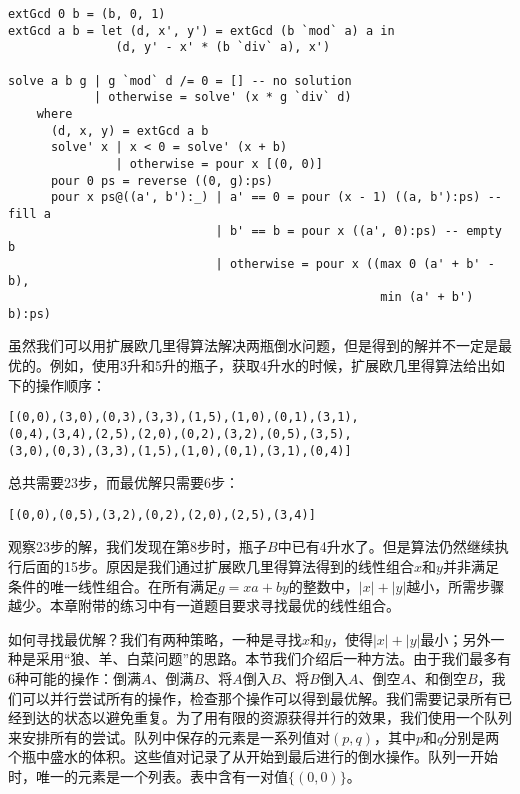 \documentclass[UTF8]{article}
\begin{document}
\lstset{language=Haskell}
\begin{lstlisting}
extGcd 0 b = (b, 0, 1)
extGcd a b = let (d, x', y') = extGcd (b `mod` a) a in
               (d, y' - x' * (b `div` a), x')

solve a b g | g `mod` d /= 0 = [] -- no solution
            | otherwise = solve' (x * g `div` d)
    where
      (d, x, y) = extGcd a b
      solve' x | x < 0 = solve' (x + b)
               | otherwise = pour x [(0, 0)]
      pour 0 ps = reverse ((0, g):ps)
      pour x ps@((a', b'):_) | a' == 0 = pour (x - 1) ((a, b'):ps) -- fill a
                             | b' == b = pour x ((a', 0):ps) -- empty b
                             | otherwise = pour x ((max 0 (a' + b' - b),
                                                    min (a' + b') b):ps)
\end{lstlisting}

虽然我们可以用扩展欧几里得算法解决两瓶倒水问题，但是得到的解并不一定是最优的。例如，使用3升和5升的瓶子，获取4升水的时候，扩展欧几里得算法给出如下的操作顺序：

\begin{verbatim}
[(0,0),(3,0),(0,3),(3,3),(1,5),(1,0),(0,1),(3,1),
(0,4),(3,4),(2,5),(2,0),(0,2),(3,2),(0,5),(3,5),
(3,0),(0,3),(3,3),(1,5),(1,0),(0,1),(3,1),(0,4)]
\end{verbatim}

总共需要23步，而最优解只需要6步：

\begin{verbatim}
[(0,0),(0,5),(3,2),(0,2),(2,0),(2,5),(3,4)]
\end{verbatim}

观察23步的解，我们发现在第8步时，瓶子$B$中已有4升水了。但是算法仍然继续执行后面的15步。原因是我们通过扩展欧几里得算法得到的线性组合$x$和$y$并非满足条件的唯一线性组合。在所有满足$g = x a + b y$的整数中，$|x| + |y|$越小，所需步骤越少。本章附带的练习中有一道题目要求寻找最优的线性组合。

如何寻找最优解？我们有两种策略，一种是寻找$x$和$y$，使得$|x| + |y|$最小；另外一种是采用“狼、羊、白菜问题”的思路。本节我们介绍后一种方法。由于我们最多有6种可能的操作：倒满$A$、倒满$B$、将$A$倒入$B$、将$B$倒入$A$、倒空$A$、和倒空$B$，我们可以并行尝试所有的操作，检查那个操作可以得到最优解。我们需要记录所有已经到达的状态以避免重复。为了用有限的资源获得并行的效果，我们使用一个队列来安排所有的尝试。队列中保存的元素是一系列值对$(p, q)$，其中$p$和$q$分别是两个瓶中盛水的体积。这些值对记录了从开始到最后进行的倒水操作。队列一开始时，唯一的元素是一个列表。表中含有一对值$\{ (0, 0) \}$。
\end{document}
